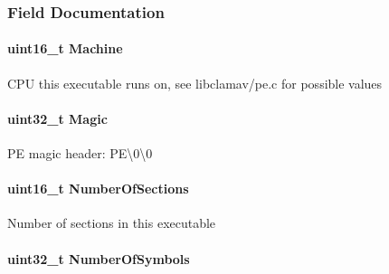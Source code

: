 \subsubsection{Field Documentation}
\hypertarget{structpe__image__file__hdr_a51d503029c67ea2862fe31a71cd4212d}{
\paragraph[{Machine}]{\setlength{\rightskip}{0pt plus 5cm}uint16\-\_\-t Machine}}\label{structpe__image__file__hdr_a51d503029c67ea2862fe31a71cd4212d}
C\-P\-U this executable runs on, see libclamav/pe.\-c for possible values \hypertarget{structpe__image__file__hdr_aacdf4d16fc118936413e1bfe23b9e444}{
\paragraph[{Magic}]{\setlength{\rightskip}{0pt plus 5cm}uint32\-\_\-t Magic}}\label{structpe__image__file__hdr_aacdf4d16fc118936413e1bfe23b9e444}
P\-E magic header\-: P\-E\textbackslash{}0\textbackslash{}0 \hypertarget{structpe__image__file__hdr_aad0798860a6f2bc09b927345db02e074}{
\paragraph[{Number\-Of\-Sections}]{\setlength{\rightskip}{0pt plus 5cm}uint16\-\_\-t Number\-Of\-Sections}}\label{structpe__image__file__hdr_aad0798860a6f2bc09b927345db02e074}
Number of sections in this executable \hypertarget{structpe__image__file__hdr_a4dbc3cb95c8f5dfe95a9c7d346db9844}{
\paragraph[{Number\-Of\-Symbols}]{\setlength{\rightskip}{0pt plus 5cm}uint32\-\_\-t Number\-Of\-Symbols}}\label{structpe__image__file__hdr_a4dbc3cb95c8f5dfe95a9c7d346db9844}

